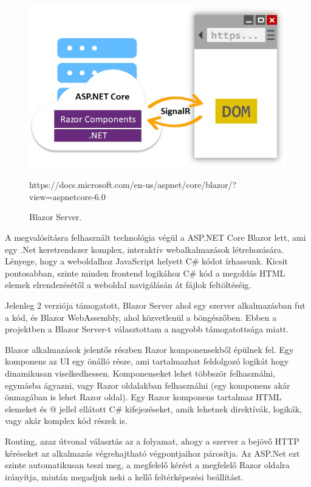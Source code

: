 
\begin{figure}[h]
\centering
\includegraphics[scale=0.5]{images/blazor.jpg}
\caption{Blazor Server.}
\centering\par
https://docs.microsoft.com/en-us/aspnet/core/blazor/?view=aspnetcore-6.0
\label{fig:blazor}
\end{figure}

A megvalósításra felhasznált technológia végül a ASP.NET Core Blazor lett, ami egy .Net keretrendszer komplex, interaktív webalkalmazások létrehozására. Lényege, hogy a weboldalhoz  JavaScript helyett C\# kódot írhassunk. Kicsit pontosabban, szinte minden frontend logikához C\# kód a megoldás HTML elemek elrendezésétől a weboldal navigálásán át fájlok feltöltéséig.

Jelenleg 2 verziója támogatott, Blazor Server ahol egy szerver alkalmazásban fut a kód, és Blazor WebAssembly, ahol közvetlenül a böngészőben. Ebben a projektben a Blazor Server-t választottam a nagyobb támogatottsága miatt.

Blazor alkalmazások jelentős részben Razor komponensekből épülnek fel. Egy komponens az UI egy önálló része, ami tartalmazhat feldolgozó logikát hogy dinamikusan viselkedhessen. Komponenseket lehet többször felhasználni, egymásba ágyazni, vagy Razor oldalakban felhasználni (egy komponens akár önmagában is lehet Razor oldal). Egy Razor komponens tartalmaz HTML elemeket és @ jellel ellátott C\# kifejezéseket, amik lehetnek direktívák, logikák, vagy akár komplex kód részek is.

Routing, azaz útvonal választás az a folyamat, ahogy a szerver a bejövő HTTP kéréseket az alkalmazás végrehajtható végpontjaihoz párosítja. Az ASP.Net ezt szinte automatikusan teszi meg, a megfelelő kérést a megfelelő Razor oldalra irányítja, miután megadjuk neki a kellő feltérképezési beállítást. 

